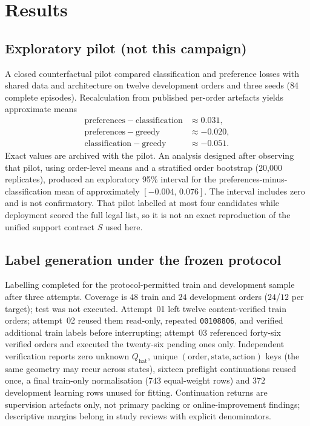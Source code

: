 \section{Results}

\subsection{Exploratory pilot (not this campaign)}

A closed counterfactual pilot compared classification and preference losses with
shared data and architecture on twelve development orders and three seeds
(84 complete episodes). Recalculation from published per-order artefacts yields
approximate means
\begin{align*}
\mathrm{preferences}-\mathrm{classification} &\approx 0.031,\\
\mathrm{preferences}-\mathrm{greedy} &\approx -0.020,\\
\mathrm{classification}-\mathrm{greedy} &\approx -0.051.
\end{align*}
Exact values are archived with the pilot. An analysis designed after observing
that pilot, using order-level means and a stratified order bootstrap
(20{,}000 replicates), produced an exploratory 95\% interval for the
preferences-minus-classification mean of approximately $[-0.004,\,0.076]$. The
interval includes zero and is not confirmatory. That pilot labelled at most four
candidates while deployment scored the full legal list, so it is not an exact
reproduction of the unified support contract $S$ used here.

\subsection{Label generation under the frozen protocol}

Labelling completed for the protocol-permitted train and development sample
after three attempts. Coverage is $48$ train and $24$ development orders
($24$/$12$ per target); test was not executed. Attempt~01 left twelve
content-verified train orders; attempt~02 reused them read-only, repeated
\texttt{00108806}, and verified additional train labels before interrupting;
attempt~03 referenced forty-six verified orders and executed the twenty-six
pending ones only. Independent verification reports zero unknown $Q_{\mathrm{hat}}$,
unique $(\mathrm{order},\mathrm{state},\mathrm{action})$ keys (the same geometry
may recur across states), sixteen preflight continuations reused once, a final
train-only normalisation ($743$ equal-weight rows) and $372$ development learning
rows unused for fitting. Continuation returns
are supervision artefacts only, not primary packing or online-improvement
findings; descriptive margins belong in study reviews with explicit denominators.

